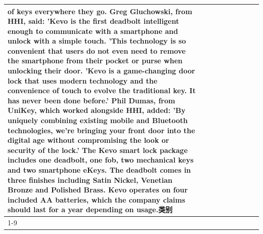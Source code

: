 \begin{table}[H]
\begin{tabular}{lllrlllll}
of keys everywhere they go. Greg Gluchowski, from HHI, said: 'Kevo is the first deadbolt intelligent enough to communicate with a smartphone and unlock with a simple touch. 'This technology is so convenient that users do not even need to remove the smartphone from their pocket or purse when unlocking their door. 'Kevo is a game-changing door lock that uses modern technology and the convenience of touch to evolve the traditional key. It has never been done before.' Phil Dumas, from UniKey, which worked alongside HHI, added: 'By uniquely combining existing mobile and Bluetooth technologies, we’re bringing your front door into the digital age without compromising the look or security of the lock.' The Kevo smart lock package includes one deadbolt, one fob, two mechanical keys and two smartphone eKeys. The deadbolt comes in three finishes including Satin Nickel, Venetian Bronze and Polished Brass. Kevo operates on four included AA batteries, which the company claims should last for a year depending on usage.类别 \\
\cline{1-9}

\end{tabular}
\end{table}
